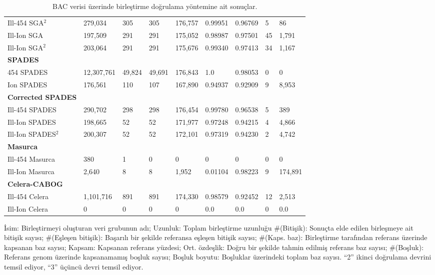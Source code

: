 \begin{table}[htb]
\begin{center}
{\begin{tabular}{l|l|l|l|l|l|l|l|l|}
         Ill-454 SGA$^2$ & 279,034 & 305 & 305 & 176,757 & 0.99951 & 0.96769 & 5 & 86 \\
         Ill-Ion SGA & 197,509 & 291 & 291 & 175,052 & 0.98987 & 0.97501 & 45 & 1,791 \\
         Ill-Ion SGA$^2$ & 203,064 & 291 & 291 & 175,676 & 0.99340 & 0.97413 & 34 & 1,167 \\
         \textbf{SPADES} & & & & & & & & \\
         454 SPADES & 12,307,761 & 49,824 & 49,691 & 176,843 & 1.0 & 0.98053 & 0 & 0 \\
         Ion SPADES & 176,561 & 110 & 107 & 167,890 & 0.94937 & 0.92909 & 9 & 8,953 \\	
         \hline
         \textbf{Corrected SPADES} & & & & & & & & \\
         Ill-454 SPADES & 290,702 & 298 & 298 & 176,454 & 0.99780 & 0.96538 & 5 & 389 \\
         Ill-Ion SPADES & 198,665 & 52 & 52 & 171,977 & 0.97248 & 0.94215 & 4 & 4,866 \\
         Ill-Ion SPADES$^2$ & 200,307 & 52 & 52 & 172,101 & 0.97319 & 0.94230 & 2 & 4,742 \\
         \textbf{Masurca} & & & & & & & & \\
         Ill-454 Masurca & 380 & 1 & 0 & 0 & 0 & 0 & 0 & 0 \\
         Ill-Ion Masurca & 2,640 & 8 & 8 & 1,952 & 0.01104 & 0.98223 & 9 & 174,891 \\
 		\textbf{Celera-CABOG} & & & & & & & & \\
         Ill-454 Celera & 1,101,716 & 891 & 891 & 174,330 & 0.98579 & 0.92452 & 12 & 2,513 \\
         Ill-Ion Celera & 0 & 0 & 0 & 0 & 0.0 & 0.0 & 0 & 0.0 \\
\hline
\end{tabular}
}
\end{center}
{\footnotesize İsim: Birleştirmeyi oluşturan veri grubunun adı; Uzunluk: Toplam birleştirme uzunluğu \#(Bitişik): Sonuçta elde edilen birleşmeye ait bitişik sayısı; \#(Eşleşen bitişik): Başarılı bir şekilde referansa eşleşen bitişik sayısı; \#(Kaps. baz):  Birleştirme tarafından referans üzerinde kapsanan baz sayısı; Kapsam: Kapsanan referans yüzdesi; Ort. özdeşlik: Doğru bir şekilde tahmin edilmiş referans baz sayısı; \#(Boşluk): Referans genom üzerinde kapsanamamış boşluk sayısı; Boşluk boyutu: Boşluklar üzerindeki toplam baz sayısı.
  ``2'' ikinci doğrulama devrini temsil ediyor, ``3'' üçüncü devri temsil ediyor.}
\caption{BAC verisi üzerinde birleştirme doğrulama yöntemine ait sonuçlar.}
\label{tab:resultsTable}

\end{table}




